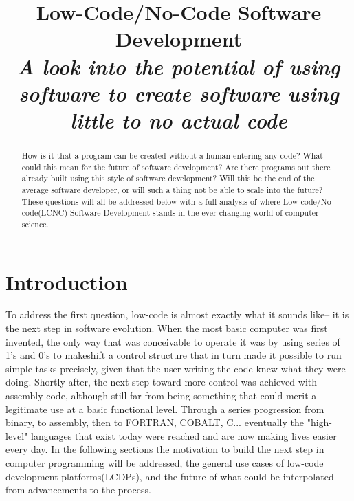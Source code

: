 \documentclass[conference]{IEEEtran}
\begin{document}
\title{Low-Code/No-Code Software Development\\
{\footnotesize \textsuperscript{}\textit{A look into the potential of using software to create software using little to no actual code}}
}

\author{
}
\maketitle
\begin{abstract}
How is it that a program can be created without a human entering any code?  What could this mean for the future of software development?  Are there programs out there already built using this style of software development?
Will this be the end of the average software developer, or will such a thing not be able to scale into the future?  These questions will all be addressed below with a full analysis of where Low-code/No-code(LCNC) Software Development stands in the ever-changing world of computer science.
\end{abstract}

\section{Introduction}
To address the first question, low-code is almost exactly what it sounds like-- it is the next step in software evolution.  When the most basic computer was first invented, the only way that was conceivable to operate it was by using series of 1's and 0's to makeshift a control structure that in turn made it possible to run simple tasks precisely, given that the user writing the code knew what they were doing.  Shortly after, the next step toward more control was achieved with assembly code, although still far from being something that could merit a legitimate use at a basic functional level.  Through a series progression from binary, to assembly, then to FORTRAN, COBALT, C... eventually the "high-level" languages that exist today were reached and are now making lives easier every day\cite{OLP}.  In the following sections the motivation to build the next step in computer programming will be addressed, the general use cases of low-code development platforms(LCDPs), and the future of what could be interpolated from advancements to the process.
\end{document}
